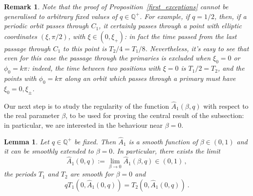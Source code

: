 \documentclass[a4paper]{article}
\newtheorem{lemma}{Lemma}
\newtheorem{remark}{Remark}
\begin{document}
\begin{remark} 
Note that the proof of Proposition~\ref{first_exceptions} cannot be
generalised to arbitrary fixed values of $q \in {\mathbb{Q}}^+$. For example, if
$q=1/2$, then, if a periodic orbit passes through $C_1$, it certainly
passes through a point with elliptic coordinates $(\xi,\pi/2)$, with
$\xi \in (0, \xi_+)$: in fact the time passed from the last passage
through $C_1$ to this point is $T_2/4=T_1/8$. Nevertheless, it's easy
to see that even for this case the passage through the primaries is
excluded when $\xi_0=0$ or $\phi_0=k\pi$: indeed, the time between two
positions with $\xi=0$ is $T_1/2=T_2$, and the points with
$\phi_0=k\pi$ along an orbit which passes through a primary must have
$\xi_0=0,\xi_{\pm}$.
\end{remark}

Our next step is to study the regularity of the function $\hat{A}_1(\beta,q)$ 
with respect to the real parameter $\beta$, to be used for proving the central 
result of the subsection: in particular, we are interested in the behaviour 
near $\beta=0$.
\begin{lemma}
  \label{regularA}
  Let $q \in {\mathbb{Q}}^+$ be fixed. 
  Then $\hat{A}_1$ is a smooth function of $\beta \in (0,1)$ and it can be 
  smoothly extended to $\beta=0$. In particular, there exists the limit 
  \[
  \hat{A}_1(0,q):=\lim_{\beta \rightarrow 0}\hat{A}_1(\beta,q) \in 
  \left(0,1\right)\,,
  \]
  the periods $T_1$ and $T_2$ are smooth for $\beta=0$ and 
  \[
  qT_1(0,\hat{A}_1(0,q))=T_2(0,\hat{A}_1(0,q))\ .
  \]
\end{lemma}
\end{document}

